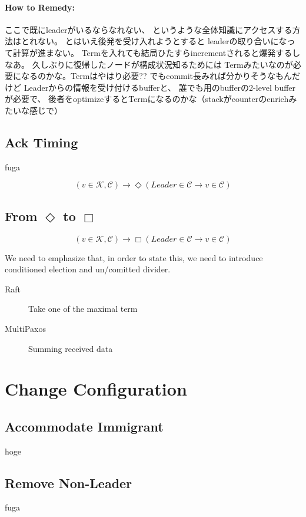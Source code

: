 \documentclass[sigconf,nonacm]{acmart}
\newcommand{\red}[1]{{\color{red}#1}}
\newcommand*{\Ja}[1]{\begin{CJK}{UTF8}{ipxm}#1\end{CJK}}
\begin{document}
\paragraph{How to Remedy:}
\mbox{}

\Ja{
ここで既にleaderがいるならなれない、
というような全体知識にアクセスする方法はとれない。
とはいえ後発を受け入れようとすると
leaderの取り合いになって計算が進まない。
%
Termを入れても結局ひたすらincrementされると爆発するしなあ。
%
久しぶりに復帰したノードが構成状況知るためには
Termみたいなのが必要になるのかな。Termはやはり必要??
%
でもcommit長みれば分かりそうなもんだけど
%
Leaderからの情報を受け付けるbufferと、
誰でも用のbufferの2-level bufferが必要で、
後者をoptimizeするとTermになるのかな（stackがcounterのenrichみたいな感じで）
}

\subsection{Ack Timing}
\red{fuga}

\[
(v \in \mathcal{K}, \mathcal{C}) \to \Diamond (Leader \in \mathcal{C} \to v \in \mathcal{C})
\]

\subsection{From $\Diamond$ to $\Box$}

\[
(v \in \mathcal{K}, \mathcal{C}) \to \Box (Leader \in \mathcal{C} \to v \in \mathcal{C})
\]


We need to emphasize that, in order to state this, we need to introduce conditioned election and un/comitted divider.

\begin{description}
\item[Raft] Take one of the maximal term
\item[MultiPaxos] Summing received data
\end{description}

\section{Change Configuration}

\subsection{Accommodate Immigrant}
hoge

\subsection{Remove Non-Leader}
fuga
\end{document}
